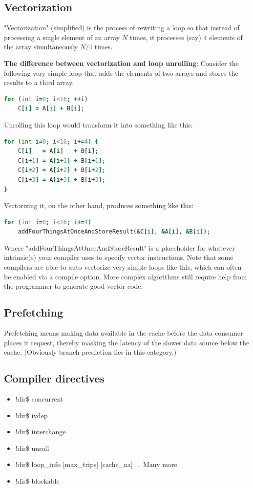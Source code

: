 \documentclass[11pt]{book} %
\begin{document}
\subsection{Vectorization}
"Vectorization" (simplified) is the process of rewriting a loop so that instead of processing a single element of an array $N$ times, it processes (say) $4$ elements of the array simultaneously $N/4$ times.

\textbf{The difference between vectorization and loop unrolling}: Consider the following very simple loop that adds the elements of two arrays and stores the results to a third array.
\begin{lstlisting}[language=Fortran, caption=simple loop]
for (int i=0; i<16; ++i)
    C[i] = A[i] + B[i];
\end{lstlisting}

Unrolling this loop would transform it into something like this:
\begin{lstlisting}[language=Fortran, caption=Loop unrolling]
for (int i=0; i<16; i+=4) {
    C[i]   = A[i]   + B[i];
    C[i+1] = A[i+1] + B[i+1];
    C[i+2] = A[i+2] + B[i+2];
    C[i+3] = A[i+3] + B[i+3];
}
\end{lstlisting}
Vectorizing it, on the other hand, produces something like this:
\begin{lstlisting}[language=Fortran, caption=Vectorization]
for (int i=0; i<16; i+=4)
    addFourThingsAtOnceAndStoreResult(&C[i], &A[i], &B[i]);
\end{lstlisting}
Where "addFourThingsAtOnceAndStoreResult" is a placeholder for whatever intrinsic(s) your compiler uses to specify vector instructions. Note that some compilers are able to auto vectorize very simple loops like this, which can often be enabled via a compile option. More complex algorithms still require help from the programmer to generate good vector code.

\subsection{Prefetching}
Prefetching means making data available in the cache before the data consumer places it request, thereby masking the latency of the slower data source below the cache. (Obviously branch prediction lies in this category.)

\subsection{Compiler directives}
\begin{itemize}
\item !dir\$ concurrent
\item !dir\$ ivdep
\item !dir\$ interchange
\item !dir\$ unroll
\item !dir\$ loop\_info [max\_trips] [cache\_na] ... Many more
\item !dir\$ blockable
\end{itemize}
\end{document}
